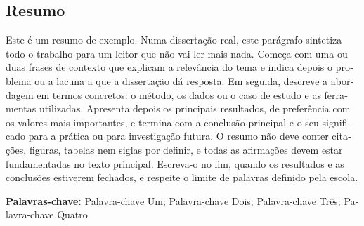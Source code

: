 
\begin{otherlanguage}{portuguese}
\chapter*{Resumo}

Este é um resumo de exemplo. Numa dissertação real, este parágrafo
sintetiza todo o trabalho para um leitor que não vai ler mais nada. Começa
com uma ou duas frases de contexto que explicam a relevância do tema e
indica depois o problema ou a lacuna a que a dissertação dá resposta. Em
seguida, descreve a abordagem em termos concretos: o método, os dados ou o
caso de estudo e as ferramentas utilizadas. Apresenta depois os principais
resultados, de preferência com os valores mais importantes, e termina com a
conclusão principal e o seu significado para a prática ou para investigação
futura. O resumo não deve conter citações, figuras, tabelas nem siglas por
definir, e todas as afirmações devem estar fundamentadas no texto
principal. Escreva-o no fim, quando os resultados e as conclusões estiverem
fechados, e respeite o limite de palavras definido pela escola.

\vspace{1em}
\noindent\textbf{Palavras-chave:} Palavra-chave Um; Palavra-chave Dois; Palavra-chave Três; Palavra-chave Quatro
\end{otherlanguage}
